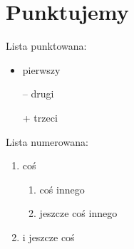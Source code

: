 \documentclass[12pt, a4paper]{article}
\begin{document}
\section{Punktujemy}
\label{sec:Punktujemy}
Lista punktowana:
\begin{itemize}
	\item pierwszy
	\item[--] drugi
	\item[+] trzeci
\end{itemize}
Lista numerowana:
\begin{enumerate}
	\item coś
	
	\begin{enumerate}
		\item coś innego
		\item jeszcze coś innego
		
	\end{enumerate}
	\item i jeszcze coś 
\end{enumerate}



 
\end{document}
